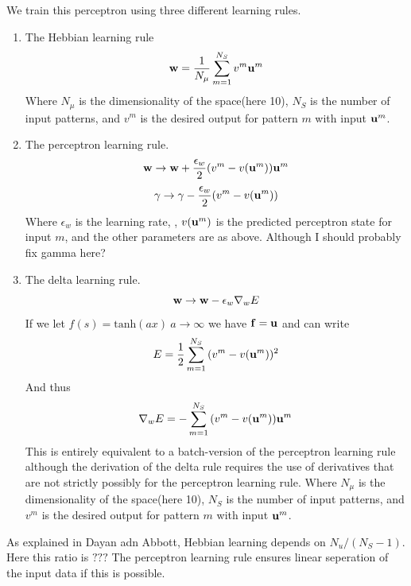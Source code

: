 \documentclass{article}
\begin{document}
We train this perceptron using three different learning rules.
\begin{enumerate}
\item
The Hebbian learning rule
\begin{equation}
{\bf w} = \dfrac{1}{N_\mu} \sum_{m = 1}^{N_S}{v^m {\bf u}^m}
\end{equation}
Where $N_\mu$ is the dimensionality of the space(here 10), $N_S$ is the number of input patterns, and $v^m$ is the desired output for pattern $m$ with input ${\bf u}^m$.

\item
The perceptron learning rule.
\begin{equation}
{\bf w} \rightarrow {\bf w} + \dfrac{\epsilon_w}{2}(v^m - v({\bf u}^m)) {\bf u}^m
\end{equation}
\begin{equation}
\gamma \rightarrow \gamma - \dfrac{\epsilon_w}{2}(v^m - v({\bf u}^m))
\end{equation}
Where $\epsilon_w$ is the learning rate, ,  $v({\bf u}^m)$ is the predicted perceptron state for input $m$, and the other parameters are as above. Although I should probably fix gamma here?

\item
The delta learning rule. 
\begin{equation}
{\bf w} \rightarrow {\bf w} - \epsilon_w \nabla_w E
\end{equation}
If we let $f(s)=\text{tanh}(ax) ~ a \rightarrow \infty$ we have ${\bf f} = {\bf u}$ and can write 
\begin{equation}
E = \dfrac{1}{2} \sum_{m=1}^{N_S}{(v^m-v({\bf u}^m))^2}
\end{equation}
And thus
\begin{equation}
 \nabla_w E = - \sum_{m=1}^{N_S}{(v^m-v({\bf u}^m)) {\bf u}^m}
\end{equation}
This is entirely equivalent to a batch-version of the perceptron learning rule although the derivation of the delta rule requires the use of derivatives that are not strictly possibly for the perceptron learning rule.
Where $N_\mu$ is the dimensionality of the space(here 10), $N_S$ is the number of input patterns, and $v^m$ is the desired output for pattern $m$ with input ${\bf u}^m$.

\end{enumerate}


As explained in Dayan adn Abbott, Hebbian learning depends on $N_u / (N_S - 1)$. Here this ratio is $???$
The perceptron learning rule ensures linear seperation of the input data if this is possible.
\end{document}
